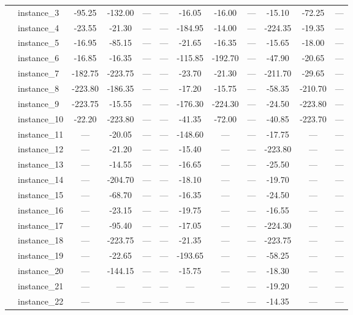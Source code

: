 \documentclass[sigconf]{acmart}
\begin{document}
\begin{table}[htbp]
\begin{tabular}{ll cccc ccc ccc}
 & instance\_3 & -95.25 & -132.00 & --- & --- & -16.05 & -16.00 & --- & -15.10 & -72.25 & --- \\
 & instance\_4 & -23.55 & -21.30 & --- & --- & -184.95 & -14.00 & --- & -224.35 & -19.35 & --- \\
 & instance\_5 & -16.95 & -85.15 & --- & --- & -21.65 & -16.35 & --- & -15.65 & -18.00 & --- \\
 & instance\_6 & -16.85 & -16.35 & --- & --- & -115.85 & -192.70 & --- & -47.90 & -20.65 & --- \\
 & instance\_7 & -182.75 & -223.75 & --- & --- & -23.70 & -21.30 & --- & -211.70 & -29.65 & --- \\
 & instance\_8 & -223.80 & -186.35 & --- & --- & -17.20 & -15.75 & --- & -58.35 & -210.70 & --- \\
 & instance\_9 & -223.75 & -15.55 & --- & --- & -176.30 & -224.30 & --- & -24.50 & -223.80 & --- \\
 & instance\_10 & -22.20 & -223.80 & --- & --- & -41.35 & -72.00 & --- & -40.85 & -223.70 & --- \\
 & instance\_11 & --- & -20.05 & --- & --- & -148.60 & --- & --- & -17.75 & --- & --- \\
 & instance\_12 & --- & -21.20 & --- & --- & -15.40 & --- & --- & -223.80 & --- & --- \\
 & instance\_13 & --- & -14.55 & --- & --- & -16.65 & --- & --- & -25.50 & --- & --- \\
 & instance\_14 & --- & -204.70 & --- & --- & -18.10 & --- & --- & -19.70 & --- & --- \\
 & instance\_15 & --- & -68.70 & --- & --- & -16.35 & --- & --- & -24.50 & --- & --- \\
 & instance\_16 & --- & -23.15 & --- & --- & -19.75 & --- & --- & -16.55 & --- & --- \\
 & instance\_17 & --- & -95.40 & --- & --- & -17.05 & --- & --- & -224.30 & --- & --- \\
 & instance\_18 & --- & -223.75 & --- & --- & -21.35 & --- & --- & -223.75 & --- & --- \\
 & instance\_19 & --- & -22.65 & --- & --- & -193.65 & --- & --- & -58.25 & --- & --- \\
 & instance\_20 & --- & -144.15 & --- & --- & -15.75 & --- & --- & -18.30 & --- & --- \\
 & instance\_21 & --- & --- & --- & --- & --- & --- & --- & -19.20 & --- & --- \\
 & instance\_22 & --- & --- & --- & --- & --- & --- & --- & -14.35 & --- & --- \\

\end{tabular}
\end{table}
\end{document}
